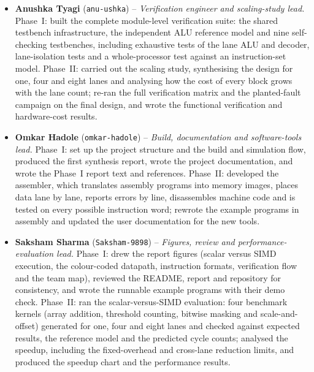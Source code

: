 \documentclass[conference]{IEEEtran}
\begin{document}
\begin{itemize}
      integrated the final report, with result tables generated directly from
      the evidence, and wrote the abstract, introduction and conclusion.
\item \textbf{Anushka Tyagi} (\texttt{anu-ushka}) -- \emph{Verification
      engineer and scaling-study lead.} Phase~I: built the complete
      module-level verification suite: the shared testbench infrastructure, the
      independent ALU reference model and nine self-checking testbenches,
      including exhaustive tests of the lane ALU and decoder, lane-isolation
      tests and a whole-processor test against an instruction-set model.
      Phase~II: carried out the scaling study, synthesising the design for
      one, four and eight lanes and analysing how the cost of every block grows
      with the lane count; re-ran the full verification matrix and the
      planted-fault campaign on the final design, and wrote the functional
      verification and hardware-cost results.
\item \textbf{Omkar Hadole} (\texttt{omkar-hadole}) -- \emph{Build,
      documentation and software-tools lead.} Phase~I: set up the project
      structure and the build and simulation flow, produced the first synthesis
      report, wrote the project documentation, and wrote the Phase~I report text
      and references. Phase~II: developed the assembler, which translates
      assembly programs into memory images, places data lane by lane, reports
      errors by line, disassembles machine code and is tested on every
      possible instruction word; rewrote the example programs in assembly
      and updated the user documentation for the new tools.
\item \textbf{Saksham Sharma} (\texttt{Saksham-9898}) -- \emph{Figures, review
      and performance-evaluation lead.} Phase~I: drew the report figures
      (scalar versus SIMD execution, the colour-coded datapath, instruction
      formats, verification flow and the team map), reviewed the README,
      report and repository for consistency, and wrote the runnable example
      programs with their demo check. Phase~II: ran the scalar-versus-SIMD
      evaluation: four benchmark kernels (array addition, threshold counting,
      bitwise masking and scale-and-offset) generated for one, four and eight
      lanes and checked against expected results, the reference model and the
      predicted cycle counts; analysed the speedup, including the
      fixed-overhead and cross-lane reduction limits, and produced the speedup
      chart and the performance results.
\end{itemize}
\end{document}
